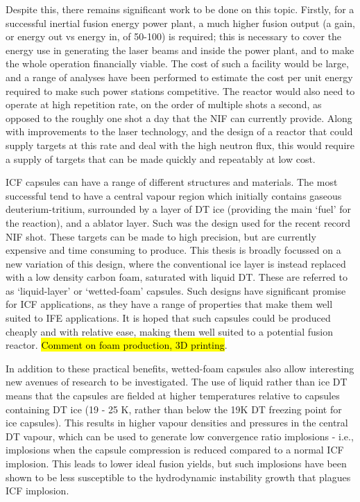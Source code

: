 Despite this, there remains significant work to be done on this topic. Firstly, for a successful inertial fusion energy power plant, a much higher fusion output (a gain, or energy out vs energy in, of 50-100) is required; this is necessary to cover the energy use in generating the laser beams and inside the power plant, and to make the whole operation financially viable. The cost of such a facility would be large, and a range of analyses have been performed to estimate the cost per unit energy required to make such power stations competitive. The reactor would also need to operate at high repetition rate, on the order of multiple shots a second, as opposed to the roughly one shot a day that the NIF can currently provide. Along with improvements to the laser technology, and the design of a reactor that could supply targets at this rate and deal with the high neutron flux, this would require a supply of targets that can be made quickly and repeatably at low cost.

ICF capsules can have a range of different structures and materials. The most successful tend to have a central vapour region which initially contains gaseous deuterium-tritium, surrounded by a layer of DT ice (providing the main `fuel' for the reaction), and a ablator layer. Such was the design used for the recent record NIF shot. These targets can be made to high precision, but are currently expensive and time consuming to produce. This thesis is broadly focussed on a new variation of this design, where the conventional ice layer is instead replaced with a low density carbon foam, saturated with liquid DT. These are referred to as `liquid-layer' or `wetted-foam' capsules. Such designs have significant promise for ICF applications, as they have a range of properties that make them well suited to IFE applications. It is hoped that such capsules could be produced cheaply and with relative ease, making them well suited to a potential fusion reactor. \hl{Comment on foam production, 3D printing}.

In addition to these practical benefits, wetted-foam capsules also allow interesting new avenues of research to be investigated. The use of liquid rather than ice DT means that the capsules are fielded at higher temperatures relative to capsules containing DT ice (19 - 25 K, rather than below the 19K DT freezing point for ice capsules). This results in higher vapour densities and pressures in the central DT vapour, which can be used to generate low convergence ratio implosions - i.e., implosions when the capsule compression is reduced compared to a normal ICF implosion. This leads to lower ideal fusion yields, but such implosions have been shown to be less susceptible to the hydrodynamic instability growth that plagues ICF implosion.

